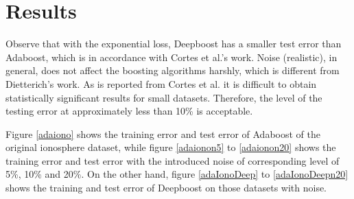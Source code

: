 \section{Results}
Observe that with the exponential loss, Deepboost has a smaller test error than Adaboost, which is in accordance with Cortes et al.’s work\cite{cortes2014deep}.
Noise (realistic), in general, does not affect the boosting algorithms harshly, which is different from Dietterich’s work\cite{dietterich2000experimental}.
As is reported from Cortes et al. it is difficult to obtain statistically significant results for small datasets.
Therefore, the level of the testing error at approximately less than 10\% is acceptable.

Figure \ref{adaiono} shows the training error and test error of Adaboost of the original ionosphere dataset,
while figure \ref{adaionon5} to \ref{adaionon20} shows the training error and test error with the introduced noise of
corresponding level of 5\%, 10\% and 20\%. On the other hand, figure \ref{adaIonoDeep} to \ref{adaIonoDeepn20} shows the training
and test error of Deepboost on those datasets with noise.










